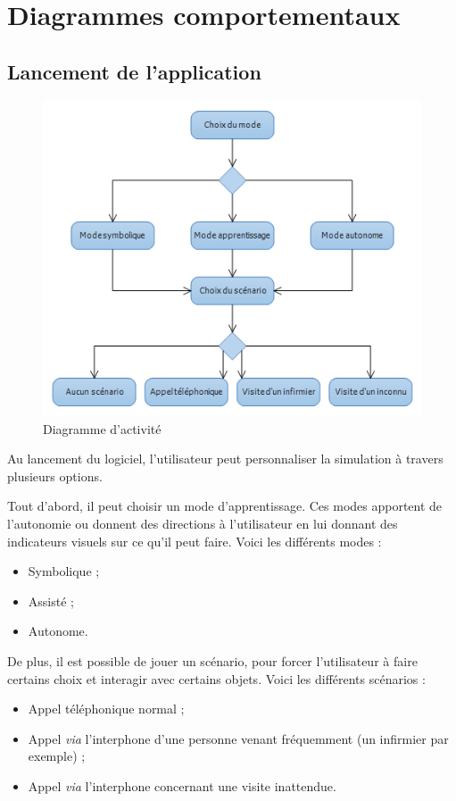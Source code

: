 \section{Diagrammes comportementaux}

\subsection{Lancement de l'application}
\begin{figure}[h]
\centering
\includegraphics[width=1\textwidth]{4-Conception/img/diagActivite.png}
\caption{ Diagramme d'activité}
\end{figure}

Au lancement du logiciel, l'utilisateur peut personnaliser la simulation à travers plusieurs options.

Tout d'abord, il peut choisir un mode d'apprentissage. Ces modes apportent de l'autonomie ou donnent des directions à l'utilisateur en lui donnant des indicateurs visuels sur ce qu'il peut faire. Voici les différents modes :
\begin{itemize}
\item Symbolique ;
\item Assisté ;
\item Autonome.
\end{itemize}
\vspace{0.5cm}

De plus, il est possible de jouer un scénario, pour forcer l'utilisateur à faire certains choix et interagir avec certains objets. Voici les différents scénarios :
\begin{itemize}
\item Appel téléphonique normal ;
\item Appel \textit{via} l'interphone d'une personne venant fréquemment (un infirmier par exemple) ;
\item Appel \textit{via} l'interphone concernant une visite inattendue.
\end{itemize}
\vspace{0.5cm}

